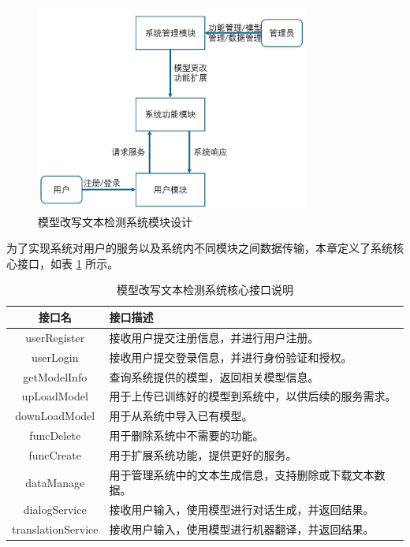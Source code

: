 \begin{figure}[htb]
    \centering
    \includegraphics[width=0.8\textwidth]{figures/sys-module.jpg}
    \caption{模型改写文本检测系统模块设计}
    \label{fig:sys-module}
\end{figure}

为了实现系统对用户的服务以及系统内不同模块之间数据传输，本章定义了系统核心接口，如表 \ref{tab:sys-interfaces} 所示。

\begin{table}[htb]
    \centering
    \caption{模型改写文本检测系统核心接口说明}
    \label{tab:sys-interfaces}
    \begin{tabular}{cl}
        \toprule
        接口名 & 接口描述 \\
        \midrule
        userRegister & 接收用户提交注册信息，并进行用户注册。 \\
        userLogin & 接收用户提交登录信息，并进行身份验证和授权。 \\
        getModelInfo & 查询系统提供的模型，返回相关模型信息。 \\
        upLoadModel & 用于上传已训练好的模型到系统中，以供后续的服务需求。 \\
        downLoadModel & 用于从系统中导入已有模型。 \\
        funcDelete & 用于删除系统中不需要的功能。 \\
        funcCreate & 用于扩展系统功能，提供更好的服务。 \\
        dataManage & 用于管理系统中的文本生成信息，支持删除或下载文本数据。 \\
        dialogService & 接收用户输入，使用模型进行对话生成，并返回结果。 \\
        translationService & 接收用户输入，使用模型进行机器翻译，并返回结果。 \\
        \bottomrule
    \end{tabular}
\end{table}

